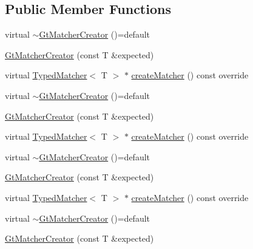 \subsection*{Public Member Functions}
\begin{DoxyCompactItemize}
\item 
virtual \mbox{\hyperlink{structfakeit_1_1internal_1_1GtMatcherCreator_a8bd4c046db5b95b6da5470c9755b4484}{$\sim$\+Gt\+Matcher\+Creator}} ()=default
\item 
\mbox{\hyperlink{structfakeit_1_1internal_1_1GtMatcherCreator_ae89b4225c99c65c7fab77f93fea6c7c7}{Gt\+Matcher\+Creator}} (const T \&expected)
\item 
virtual \mbox{\hyperlink{structfakeit_1_1TypedMatcher}{Typed\+Matcher}}$<$ T $>$ $\ast$ \mbox{\hyperlink{structfakeit_1_1internal_1_1GtMatcherCreator_ae7b905660b8aac92b70c783063c1ebdd}{create\+Matcher}} () const override
\item 
virtual \mbox{\hyperlink{structfakeit_1_1internal_1_1GtMatcherCreator_a8bd4c046db5b95b6da5470c9755b4484}{$\sim$\+Gt\+Matcher\+Creator}} ()=default
\item 
\mbox{\hyperlink{structfakeit_1_1internal_1_1GtMatcherCreator_ae89b4225c99c65c7fab77f93fea6c7c7}{Gt\+Matcher\+Creator}} (const T \&expected)
\item 
virtual \mbox{\hyperlink{structfakeit_1_1TypedMatcher}{Typed\+Matcher}}$<$ T $>$ $\ast$ \mbox{\hyperlink{structfakeit_1_1internal_1_1GtMatcherCreator_ae7b905660b8aac92b70c783063c1ebdd}{create\+Matcher}} () const override
\item 
virtual \mbox{\hyperlink{structfakeit_1_1internal_1_1GtMatcherCreator_a8bd4c046db5b95b6da5470c9755b4484}{$\sim$\+Gt\+Matcher\+Creator}} ()=default
\item 
\mbox{\hyperlink{structfakeit_1_1internal_1_1GtMatcherCreator_ae89b4225c99c65c7fab77f93fea6c7c7}{Gt\+Matcher\+Creator}} (const T \&expected)
\item 
virtual \mbox{\hyperlink{structfakeit_1_1TypedMatcher}{Typed\+Matcher}}$<$ T $>$ $\ast$ \mbox{\hyperlink{structfakeit_1_1internal_1_1GtMatcherCreator_ae7b905660b8aac92b70c783063c1ebdd}{create\+Matcher}} () const override
\item 
virtual \mbox{\hyperlink{structfakeit_1_1internal_1_1GtMatcherCreator_a8bd4c046db5b95b6da5470c9755b4484}{$\sim$\+Gt\+Matcher\+Creator}} ()=default
\item 
\mbox{\hyperlink{structfakeit_1_1internal_1_1GtMatcherCreator_ae89b4225c99c65c7fab77f93fea6c7c7}{Gt\+Matcher\+Creator}} (const T \&expected)
\item 

\end{DoxyCompactItemize}
